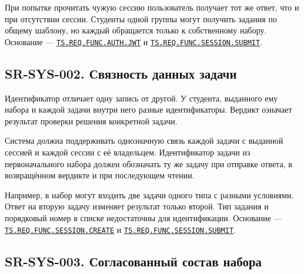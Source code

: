 \documentclass[12pt,a4paper]{article}
\begin{document}
При попытке прочитать чужую сессию пользователь получает тот же ответ, что и при отсутствии сессии. Студенты одной группы могут получить задания по общему шаблону, но каждый обращается только к собственному набору. Основание --- {\href{../02\_Техническое\_задание/Техническое\_задание.pdf\#ts-req-func-auth-jwt}{\texttt{TS.\allowbreak{}REQ.\allowbreak{}FUNC.\allowbreak{}AUTH.\allowbreak{}JWT}}} и {\href{../02\_Техническое\_задание/Техническое\_задание.pdf\#ts-req-func-session-submit}{\texttt{TS.\allowbreak{}REQ.\allowbreak{}FUNC.\allowbreak{}SESSION.\allowbreak{}SUBMIT}}}.

\subsection{SR-SYS-002. Связность данных задачи}\label{sr-sys-002-ux441ux432ux44fux437ux43dux43eux441ux442ux44c-ux434ux430ux43dux43dux44bux445-ux437ux430ux434ux430ux447ux438}

\hypertarget{sr-sys-002-связность-данных-задачи}{}

\hypertarget{sr-sys-002}{}

Идентификатор отличает одну запись от другой. У студента, выданного ему набора и каждой задачи внутри него разные идентификаторы. Вердикт означает результат проверки решения конкретной задачи.

Система должна поддерживать однозначную связь каждой задачи с выданной сессией и каждой сессии с её владельцем. Идентификатор задачи из первоначального набора должен обозначать ту же задачу при отправке ответа, в возвращённом вердикте и при последующем чтении.

Например, в набор могут входить две задачи одного типа с разными условиями. Ответ на вторую задачу изменяет результат только второй. Тип задания и порядковый номер в списке недостаточны для идентификации. Основание --- {\href{../02\_Техническое\_задание/Техническое\_задание.pdf\#ts-req-func-session-create}{\texttt{TS.\allowbreak{}REQ.\allowbreak{}FUNC.\allowbreak{}SESSION.\allowbreak{}CREATE}}} и {\href{../02\_Техническое\_задание/Техническое\_задание.pdf\#ts-req-func-session-submit}{\texttt{TS.\allowbreak{}REQ.\allowbreak{}FUNC.\allowbreak{}SESSION.\allowbreak{}SUBMIT}}}.

\subsection{SR-SYS-003. Согласованный состав набора}\label{sr-sys-003-ux441ux43eux433ux43bux430ux441ux43eux432ux430ux43dux43dux44bux439-ux441ux43eux441ux442ux430ux432-ux43dux430ux431ux43eux440ux430}
\end{document}
